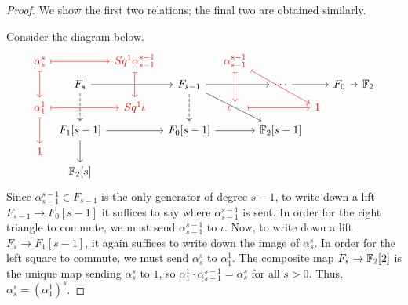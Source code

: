 \documentclass[11pt, titlepage]{article} %
\def\bb{\ensuremath\mathbb}
\def\textcolour{\textcolor}
\numberwithin{equation}{subsection}
\theoremstyle{plain}
\theoremstyle{definition}
\begin{document}
\begin{proof}
We show the first two relations; the final two are obtained similarly. %

Consider the diagram below. 
\[\begin{tikzcd}[row sep = 0.8ex, column sep=0.8ex]
\textcolour{red}{\alpha^s_s} \arrow[rr, "", mapsto, red] \arrow[dd, swap, "", red, mapsto]  & & \textcolour{red}{Sq^1\alpha^{s-1}_{s-1}}  \arrow[dd, ""', red, mapsto] & & \textcolour{red}{\alpha^{s-1}_{s-1}}  \arrow[dd, ""', red, mapsto] \arrow[rrdd, "", red, mapsto] & &&&& \\
& F_s \arrow[rr, swap, ""] \arrow[dd, ""', dashrightarrow] & & F_{s-1} \arrow[dd, ""', dashrightarrow] \arrow[rr, ""'] \arrow[rrdd] & & \cdots \arrow[rr] && F_0 \arrow[rr] && \bb{F}_2 \\
\textcolour{red}{\alpha^1_1} \arrow[rr, swap, "", red, mapsto] \arrow[dd, ""', red, mapsto] & & \textcolour{red}{Sq^1\iota} & & \textcolour{red}{\iota}\;\;\;\; \arrow[rr, ""', red, mapsto] & & \textcolour{red}{1} & & & \\
& F_1[s-1] \arrow[rr, swap, ""] \arrow[dd, ""'] & & F_0[s-1] \arrow[rr, ""'] & & \bb{F}_2[s-1] & & & &\\
\textcolour{red}{1} & &&&&&&&&\\
& \bb{F}_2[s] &&&&&&&&
\end{tikzcd}\]
Since \(\alpha^{s-1}_{s-1}\in F_{s-1}\) is the only generator of degree \(s-1\), to write down a lift \(F_{s-1}\to F_0[s-1]\) it suffices to say where \(\alpha^{s-1}_{s-1}\) is sent. In order for the right triangle to commute, we must send \(\alpha^{s-1}_{s-1}\) to \(\iota\). Now, to write down a lift \(F_s \to F_1[s-1]\), it again suffices to write down the image of \(\alpha^s_s\). In order for the left square to commute, we must send \(\alpha^s_s\) to \(\alpha^1_1\). The composite map \(F_s \to \bb{F}_2[2]\) is the unique map sending \(\alpha^s_s\) to \(1\), so \(\alpha^1_1\cdot \alpha^{s-1}_{s-1}=\alpha^s_s\) for all \(s>0\). Thus, \(\alpha^s_s=(\alpha^1_1)^s\). 


\end{proof}
\end{document}
